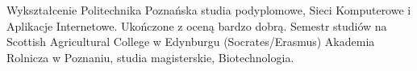 \begin{rubric}{Wykształcenie}
Politechnika Poznańska studia podyplomowe,
	Sieci Komputerowe i Aplikacje Internetowe. Ukończone z oceną bardzo dobrą.
Semestr studiów na Scottish Agricultural
College w Edynburgu (Socrates/Erasmus)
\entry*[2001 -- 2006]Akademia Rolnicza w Poznaniu, studia magisterskie,
	Biotechnologia.
\end{rubric}
